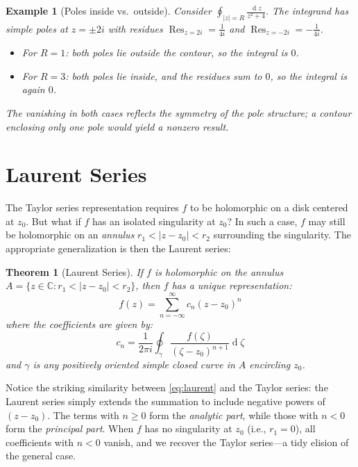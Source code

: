 \documentclass[12pt,a4paper]{report}
\DeclareMathOperator{\deriv}{d}
\theoremstyle{thms}
\newtheorem{theorem}{Theorem}[section]
\theoremstyle{defns}
\newtheorem{example}{Example}[section]
\begin{document}
\begin{example}[Poles inside vs.\ outside]
    Consider $\oint_{|z|=R} \frac{\deriv{z}}{z^2 + 4}$. The integrand has simple poles at $z = \pm 2i$ with residues $\operatorname{Res}_{z=2i} = \frac{1}{4i}$ and $\operatorname{Res}_{z=-2i} = -\frac{1}{4i}$.
    \begin{itemize}
        \item For $R = 1$: both poles lie outside the contour, so the integral is $0$.
        \item For $R = 3$: both poles lie inside, and the residues sum to $0$, so the integral is again $0$.
    \end{itemize}
    The vanishing in both cases reflects the symmetry of the pole structure; a contour enclosing only one pole would yield a nonzero result.
\end{example}

\section{Laurent Series}
\label{sec:laurent}
The Taylor series representation requires $f$ to be holomorphic on a disk centered at $z_0$. But what if $f$ has an isolated singularity at $z_0$? In such a case, $f$ may still be holomorphic on an \textit{annulus} $r_1 < |z - z_0| < r_2$ surrounding the singularity. The appropriate generalization is then the Laurent series:

\begin{theorem}[Laurent Series]
    If $f$ is holomorphic on the annulus $A = \{z \in \mathbb{C} : r_1 < |z - z_0| < r_2\}$, then $f$ has a unique representation:
    \begin{equation}
        f(z) = \sum_{n=-\infty}^{\infty} c_n(z - z_0)^n
        \label{eq:laurent}
    \end{equation}
    where the coefficients are given by:
    \begin{equation}
        c_n = \dfrac{1}{2\pi i}\oint_{\gamma} \dfrac{f(\zeta)}{(\zeta - z_0)^{n+1}}\deriv{\zeta}
        \label{eq:laurent_coeff}
    \end{equation}
    and $\gamma$ is any positively oriented simple closed curve in $A$ encircling $z_0$.
    \label{thm:laurent}
\end{theorem}

Notice the striking similarity between \eqref{eq:laurent} and the Taylor series: the Laurent series simply extends the summation to include negative powers of $(z - z_0)$. The terms with $n \geq 0$ form the \textit{analytic part}, while those with $n < 0$ form the \textit{principal part}. When $f$ has no singularity at $z_0$ (i.e., $r_1 = 0$), all coefficients with $n < 0$ vanish, and we recover the Taylor series—a tidy elision of the general case.
\end{document}
